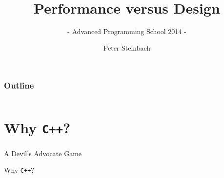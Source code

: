 \documentclass[9pt,xcolor=table]{beamer}
\def\cpp{\texttt{C++}}
\begin{document}
     
 
 
\title[PerfVsDesign]{Performance versus Design}
\subtitle{- Advanced Programming School 2014 -}
\author[P. Steinbach]{Peter Steinbach}
\date{}
\addtocounter{framenumber}{-1}
\renewcommand*\inserttotalframenumber{XX} 

 
{
\maketitle
}

\begin{frame}[t]
\frametitle{Outline}
\vspace{-1.5\baselineskip}
\begin{columns}[t]
  \begin{column}{.1\textwidth}
    \hfill
  \end{column}
  \begin{column}{.75\textwidth}
    \huge
    \tableofcontents[hideallsubsections]
  \end{column}
  \begin{column}{.1\textwidth}
    \hfill
  \end{column}
\end{columns}
\end{frame}

\section[Why \cpp{}?]{Why \cpp{}?}
\begin{frame}
\frametitle{\insertsection{}}
\begin{block}{A Devil's Advocate Game}
  \Huge
  \begin{center}
    \alert{Why \cpp{}?}
  \end{center}
\end{block}
\end{frame}
\end{document}
